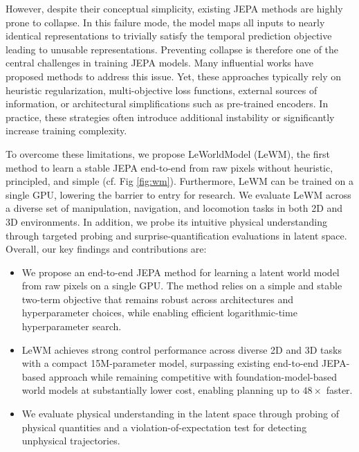 However, despite their conceptual simplicity, existing JEPA methods are highly prone to collapse. In this failure mode, the model maps all inputs to nearly identical representations to trivially satisfy the temporal prediction objective leading to unusable representations. Preventing collapse is therefore one of the central challenges in training JEPA models. Many influential works have proposed methods to address this issue. Yet, these approaches typically rely on heuristic regularization, multi-objective loss functions, external sources of information, or architectural simplifications such as pre-trained encoders. In practice, these strategies often introduce additional instability or significantly increase training complexity.

To overcome these limitations, we propose LeWorldModel (LeWM), the first method to learn a stable JEPA end-to-end from raw pixels without heuristic, principled, and simple (cf. Fig \ref{fig:wm}). Furthermore, LeWM can be trained on a single GPU, lowering the barrier to entry for research. We evaluate LeWM across a diverse set of manipulation, navigation, and locomotion tasks in both 2D and 3D environments. In addition, we probe its intuitive physical understanding through targeted probing and surprise-quantification evaluations in latent space. Overall, our key findings and contributions are:

\begin{itemize}
    \item We propose an end-to-end JEPA method for learning a latent world model from raw pixels on a single GPU. The method relies on a simple and stable two-term objective that remains robust across architectures and hyperparameter choices, while enabling efficient logarithmic-time hyperparameter search.
    \item LeWM achieves strong control performance across diverse 2D and 3D tasks with a compact 15M-parameter model, surpassing existing end-to-end JEPA-based approach while remaining competitive with foundation-model-based world models at substantially lower cost, enabling planning up to $48\times$ faster.
    \item We evaluate physical understanding in the latent space through probing of physical quantities and a violation-of-expectation test for detecting unphysical trajectories.
\end{itemize}


